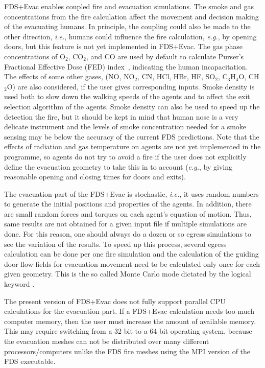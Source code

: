 \documentclass[12pt,a4paper,final,twoside]{stylevk}
\begin{document}
FDS+Evac enables coupled fire and evacuation simulations.  The smoke
and gas concentrations from the fire calculation affect the movement
and decision making of the evacuating humans.  In principle, the
coupling could also be made to the other direction, \emph{i.e.},
humans could influence the fire calculation, \emph{e.g.}, by opening
doors, but this feature is not yet implemented in FDS+Evac.  The gas
phase concentrations of $\mathrm{O_2}$, $\mathrm{CO_2}$, and
$\mathrm{CO}$ are used by default to calculate Purser's Fractional
Effective Dose (FED) index~\cite{Purser03}, indicating the human
incapacitation.  The effects of some other gases, (NO, NO${}_2$, CN,
HCl, HBr, HF, SO${}_2$, C${}_3$H${}_4$O, CH${}_2$O) are also
considered, if the user gives corresponding inputs.  Smoke density is
used both to slow down the walking speeds of the agents and to affect
the exit selection algorithm of the agents.  Smoke density can also be
used to speed up the detection the fire, but it should be kept in mind
that human nose is a very delicate instrument and the levels of smoke
concentration needed for a smoke sensing may be below the accuracy of
the current FDS predictions.  Note that the effects of radiation and
gas temperature on agents are not yet implemented in the programme, so
agents do not try to avoid a fire if the user does not explicitly
define the evacuation geometry to take this in to account
(\emph{e.g.}, by giving reasonable opening and closing times for doors
and exits).


The evacuation part of the FDS+Evac is stochastic, \emph{i.e.}, it
uses random numbers to generate the initial positions and properties
of the agents.  In addition, there are small random forces and torques
on each agent's equation of motion.  Thus, same results are not
obtained for a given input file if multiple simulations are done.  For
this reason, one should always do a dozen or so egress simulations to
see the variation of the results.  To speed up this process, several
egress calculation can be done per one fire simulation and the
calculation of the guiding door flow fields for evacuation movement
need to be calculated only once for each given geometry.  This is the
so called Monte Carlo mode dictated by the logical keyword
.


The present version of FDS+Evac does not fully support parallel CPU
calculations for the evacuation part.  If a FDS+Evac calculation needs
too much computer memory, then the user must increase the amount of
available memory.  This may require switching from a 32 bit to a 64
bit operating system, because the evacuation meshes can not be
distributed over many different processors/computers unlike the FDS
fire meshes using the MPI version of the FDS executable.
\end{document}
